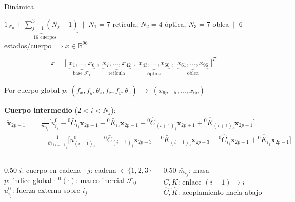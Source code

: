 \documentclass[en,16:9,navbarinline,bigfoot]{sdqbeamer}
\begin{document}
\begin{frame}{Dinámica}
    \begin{center}\footnotesize
    $\underbrace{1_{\mathcal{F}_0} + \textstyle\sum_{j=1}^{3}(N_j{-}1)}_{=\,16\text{ cuerpos}}$ 
    $\ \big|\ $ 
    $N_1{=}7$ retícula, $N_2{=}4$ óptica, $N_3{=}7$ oblea 
    $\ \big|\ $ 
    6 estados/cuerpo $\Rightarrow x\in\mathbb{R}^{96}$
    \end{center}

    \begin{equation*}
        x =
        \big[\;
            \underbrace{x_1,\ldots,x_6}_{\text{base }\mathcal{F}_1} \;,\;
            \underbrace{x_7,\ldots,x_{42}}_{\text{retícula}} \;,\;
            \underbrace{x_{43},\ldots,x_{60}}_{\text{óptica}} \;,\;
            \underbrace{x_{61},\ldots,x_{96}}_{\text{oblea}}
        \;\big]^{\!T}
    \end{equation*}

    \begin{center}\footnotesize
    Por cuerpo global $p$: $(f_x, f_y, \theta_z, \dot f_x, \dot f_y, \dot\theta_z) \;\mapsto\; (x_{6p-5},\ldots,x_{6p})$
    \end{center}

    \vspace{0.1cm}
    {\footnotesize\textbf{Cuerpo intermedio} ($2{<}i{<}N_j$):}\vspace{-0.15cm}
    \begin{align*}
        \ddot{\mathbf{x}}_{2p-1} &=
        \tfrac{1}{\bar{m}_{i_j}} \Big[ u^0_{i_j} - {}^0\bar{C}_{i_j}\dot{\mathbf{x}}_{2p-1} - {}^0\bar{K}_{i_j}\mathbf{x}_{2p-1} + {}^0\hat{C}_{(i+1)_j}\dot{\mathbf{x}}_{2p+1} + {}^0\hat{K}_{(i+1)_j}\mathbf{x}_{2p+1} \Big] \\
        &\quad - \tfrac{1}{\bar{m}_{(i-1)_j}} \Big[ u^0_{(i-1)_j} - {}^0\bar{C}_{(i-1)_j}\dot{\mathbf{x}}_{2p-3} - {}^0\bar{K}_{(i-1)_j}\mathbf{x}_{2p-3} + {}^0\hat{C}_{i_j}\dot{\mathbf{x}}_{2p-1} + {}^0\hat{K}_{i_j}\mathbf{x}_{2p-1} \Big]
    \end{align*}

    \vspace{0.05cm}
    \begin{columns}[T,onlytextwidth]
    \begin{column}{0.50\textwidth}\scriptsize
        $i$: cuerpo en cadena \;$\cdot$\; $j$: cadena $\in\{1,2,3\}$\\[1pt]
        $p$: índice global \;$\cdot$\; ${}^{0}(\cdot)$: marco inercial $\mathcal{F}_0$\\[1pt]
        $u^0_{i_j}$: fuerza externa sobre $i_j$
    \end{column}
    \begin{column}{0.50\textwidth}\scriptsize
        $\bar m_{i_j}$: masa\\[1pt]
        $\bar C,\bar K$: enlace $(i{-}1){\to}i$\\[1pt]
        $\hat C,\hat K$: acoplamiento hacia abajo
    \end{column}
    \end{columns}
\end{frame}
\end{document}
